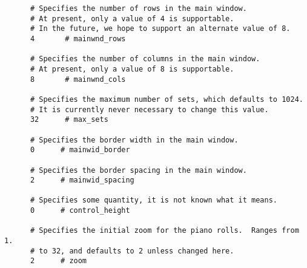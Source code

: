   \begin{verbatim}
      # Specifies the number of rows in the main window.
      # At present, only a value of 4 is supportable.
      # In the future, we hope to support an alternate value of 8.
      4       # mainwnd_rows

      # Specifies the number of columns in the main window.
      # At present, only a value of 8 is supportable.
      8       # mainwnd_cols

      # Specifies the maximum number of sets, which defaults to 1024.
      # It is currently never necessary to change this value.
      32      # max_sets

      # Specifies the border width in the main window.
      0      # mainwid_border

      # Specifies the border spacing in the main window.
      2      # mainwid_spacing

      # Specifies some quantity, it is not known what it means.
      0      # control_height

      # Specifies the initial zoom for the piano rolls.  Ranges from 1.
      # to 32, and defaults to 2 unless changed here.
      2      # zoom
   \end{verbatim}

